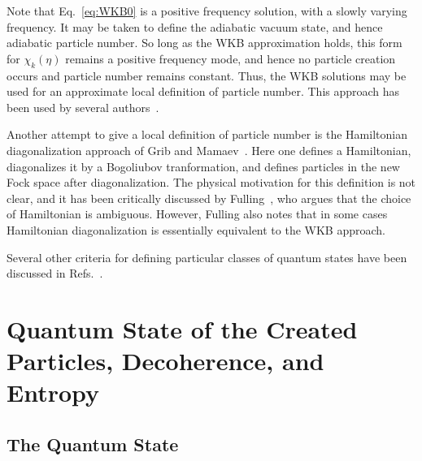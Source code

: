 \documentclass[12pt,onecolumn,eqsecnum,floats,aps,prd,floatfix,titlepage]{revtex4-2}
\begin{document}
Note that Eq.~\eqref{eq:WKB0} is a positive frequency solution, with a slowly varying frequency. It may be taken to define the adiabatic vacuum
state, and hence adiabatic particle number. So long as the WKB approximation holds, this form for $\chi_k(\eta)$ remains a positive frequency mode,
and hence no particle creation occurs and particle number remains constant. Thus, the WKB solutions may be used for an approximate local
definition of particle number. This approach has been used by several authors~\cite{Woodhouse76,Berger78,Azuma83,Winitzki05,Parker12,Agullo15}.

Another attempt to give a local definition of particle number is the Hamiltonian diagonalization approach of Grib and Mamaev~\cite{Grib69}. Here one
defines a Hamiltonian, diagonalizes it by a Bogoliubov tranformation, and defines particles in the new Fock space after diagonalization. The physical
motivation for this definition is not clear, and it has been critically discussed by Fulling~\cite{Fulling79}, who argues that the choice of Hamiltonian
is ambiguous. However, Fulling also notes that in some cases Hamiltonian diagonalization is essentially equivalent to the WKB approach. 

Several other criteria for defining particular classes of quantum states have been discussed in Refs.~\cite{Dray83,Degner,AP-Lim03,Raine75}.
 

\section{Quantum State of the Created Particles, Decoherence, and Entropy}
\label{sec:state-entropy}

\subsection{The Quantum State}
\label{sec:state}
\end{document}
